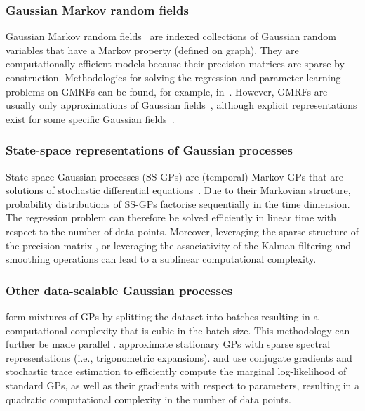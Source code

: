 \subsubsection*{Gaussian Markov random fields}
Gaussian Markov random fields~\citep[GMRFs,][]{Rue2005Book} are indexed collections of Gaussian random variables that have a Markov property (defined on graph). They are computationally efficient models because their precision matrices are sparse by construction. Methodologies for solving the regression and parameter learning problems on GMRFs can be found, for example, in~\citet{Rue2007, Rue2009N}. However, GMRFs are usually only approximations of Gaussian fields~\citep[see, e.g.,][Chapter 5]{Rue2005Book}, although explicit representations exist for some specific Gaussian fields~\citep{Lindgren2011}.

\subsubsection*{State-space representations of Gaussian processes}
State-space Gaussian processes (SS-GPs) are (temporal) Markov GPs that are solutions of stochastic differential equations~\citep[SDEs,][]{Simo2013SSGP, Sarkka2019}. Due to their Markovian structure, probability distributions of SS-GPs factorise sequentially in the time dimension. The regression problem can therefore be solved efficiently in linear time with respect to the number of data points. Moreover, leveraging the sparse structure of the precision matrix \citep{Grigorievskiy2017}, or leveraging the associativity of the Kalman filtering and smoothing operations \citep{Corenflos2021SSGP} can lead to a sublinear computational complexity.

\subsubsection*{Other data-scalable Gaussian processes}
\citet{Rasmussen2002GPexperts, Meeds2006} form mixtures of GPs by splitting the dataset into batches resulting in a computational complexity that is cubic in the batch size. This methodology can further be made parallel \citep{ZhangMinyi2019}. \citet{Lazaro2010} approximate stationary GPs with sparse spectral representations (i.e., trigonometric expansions). \citet{Gardner2018} and \citet{KeWang2019} use conjugate gradients and stochastic trace estimation to efficiently compute the marginal log-likelihood of standard GPs, as well as their gradients with respect to parameters, resulting in a quadratic computational complexity in the number of data points.

